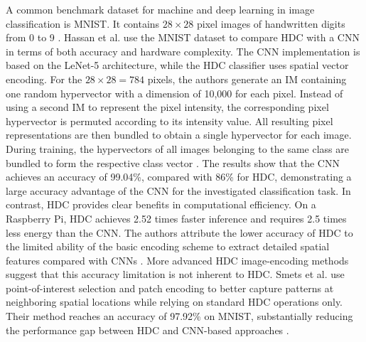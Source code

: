         A common benchmark dataset for machine and deep learning in image classification is MNIST. It contains $28 \times 28$ pixel images of handwritten digits from 0 to 9 \cite{lecun_gradient-based_1998}. Hassan et al. \cite{hassan_hyper-dimensional_2022} use the MNIST dataset to compare HDC with a \ac{CNN} in terms of both accuracy and hardware complexity. The CNN implementation is based on the LeNet-5 architecture, while the HDC classifier uses spatial vector encoding. For the $28 \times 28 = 784$ pixels, the authors generate an \ac{IM} containing one random hypervector with a dimension of 10,000 for each pixel. Instead of using a second \ac{IM} to represent the pixel intensity, the corresponding pixel hypervector is permuted according to its intensity value. All resulting pixel representations are then bundled to obtain a single hypervector for each image. During training, the hypervectors of all images belonging to the same class are bundled to form the respective class vector \cite{hassan_hyper-dimensional_2022}. 
        The results show that the CNN achieves an accuracy of 99.04\%, compared with 86\% for HDC, demonstrating a large accuracy advantage of the CNN for the investigated classification task. In contrast, HDC provides clear benefits in computational efficiency. On a Raspberry Pi, HDC achieves 2.52 times faster inference and requires 2.5 times less energy than the CNN. The authors attribute the lower accuracy of HDC to the limited ability of the basic encoding scheme to extract detailed spatial features compared with CNNs \cite{hassan_hyperdimensional_2023}. 
        More advanced HDC image-encoding methods suggest that this accuracy limitation is not inherent to HDC. Smets et al. \cite{smets_encoding_2024} use point-of-interest selection and patch encoding to better capture patterns at neighboring spatial locations while relying on standard HDC operations only. Their method reaches an accuracy of 97.92\% on MNIST, substantially reducing the performance gap between HDC and CNN-based approaches \cite{smets_encoding_2024}.\\
        
